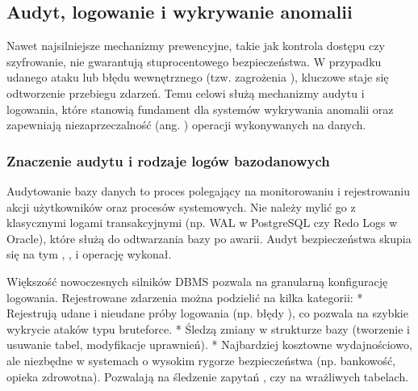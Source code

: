\documentclass[letterpaper,10pt,polish]{sphinxmanual}
\begin{document}
\subsection{Audyt, logowanie i wykrywanie anomalii}
\label{\detokenize{rozdzia_u0142_2/rozdzia_u0142_27/rozdzial_5:audyt-logowanie-i-wykrywanie-anomalii}}\label{\detokenize{rozdzia_u0142_2/rozdzia_u0142_27/rozdzial_5::doc}}
\sphinxAtStartPar
Nawet najsilniejsze mechanizmy prewencyjne, takie jak kontrola dostępu czy szyfrowanie, nie gwarantują stuprocentowego bezpieczeństwa. W przypadku udanego ataku lub błędu wewnętrznego (tzw. zagrożenia ), kluczowe staje się odtworzenie przebiegu zdarzeń. Temu celowi służą mechanizmy audytu i logowania, które stanowią fundament dla systemów wykrywania anomalii oraz zapewniają niezaprzeczalność (ang. ) operacji wykonywanych na danych.


\subsubsection{Znaczenie audytu i rodzaje logów bazodanowych}
\label{\detokenize{rozdzia_u0142_2/rozdzia_u0142_27/rozdzial_5:znaczenie-audytu-i-rodzaje-logow-bazodanowych}}
\sphinxAtStartPar
Audytowanie bazy danych to proces polegający na monitorowaniu i rejestrowaniu akcji użytkowników oraz procesów systemowych. Nie należy mylić go z klasycznymi logami transakcyjnymi (np. WAL w PostgreSQL czy Redo Logs w Oracle), które służą do odtwarzania bazy po awarii. Audyt bezpieczeństwa skupia się na tym , ,  i  operację wykonał.

\sphinxAtStartPar
Większość nowoczesnych silników DBMS pozwala na granularną konfigurację logowania. Rejestrowane zdarzenia można podzielić na kilka kategorii:
*  Rejestrują udane i nieudane próby logowania (np. błędy ), co pozwala na szybkie wykrycie ataków typu brute\sphinxhyphen{}force.
*  Śledzą zmiany w strukturze bazy (tworzenie i usuwanie tabel, modyfikacje uprawnień).
*  Najbardziej kosztowne wydajnościowo, ale niezbędne w systemach o wysokim rygorze bezpieczeństwa (np. bankowość, opieka zdrowotna). Pozwalają na śledzenie zapytań ,  czy  na wrażliwych tabelach.
\end{document}
